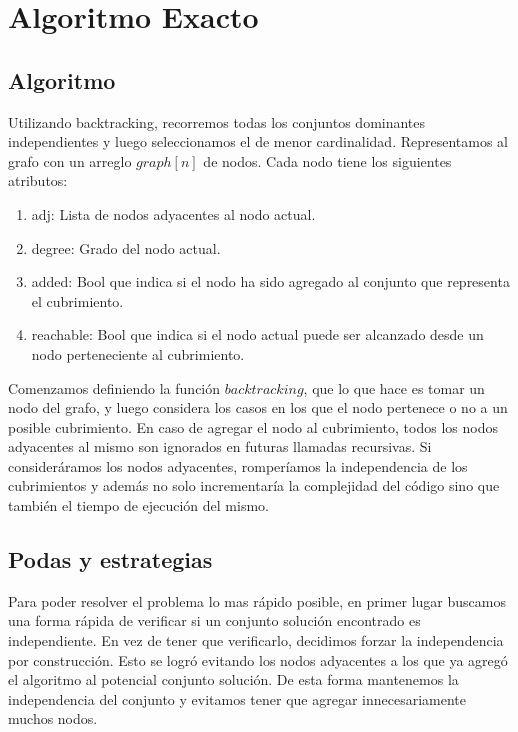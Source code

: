 \section{Algoritmo Exacto}

\subsection{Algoritmo}
Utilizando backtracking, recorremos todas los conjuntos dominantes independientes y luego seleccionamos el de menor cardinalidad.
Representamos al grafo con un arreglo $graph[n]$ de nodos. Cada nodo tiene los siguientes atributos:

\begin{enumerate}
	\item adj: Lista de nodos adyacentes al nodo actual.
	\item degree: Grado del nodo actual.
	\item added: Bool que indica si el nodo ha sido agregado al conjunto que representa el cubrimiento.
	\item reachable: Bool que indica si el nodo actual puede ser alcanzado desde un nodo perteneciente al cubrimiento.
\end{enumerate}

Comenzamos definiendo la función $backtracking$, que lo que hace es tomar un nodo del grafo, y luego considera los casos en los que el nodo pertenece o no a un posible cubrimiento. En caso de agregar el nodo al cubrimiento, todos los nodos adyacentes al mismo son ignorados en futuras llamadas recursivas. Si consideráramos los nodos adyacentes, romperíamos la independencia de los  cubrimientos y además no solo incrementaría la complejidad del código sino que también el tiempo de ejecución del mismo.

\subsection{Podas y estrategias}

Para poder resolver el problema lo mas rápido posible, en primer lugar buscamos una forma rápida de verificar si un conjunto solución encontrado es independiente. En vez de tener que verificarlo, decidimos forzar la independencia por construcción. Esto se logró evitando los nodos adyacentes a los que ya agregó el algoritmo al potencial conjunto solución. De esta forma mantenemos la independencia del conjunto y evitamos tener que agregar innecesariamente muchos nodos. 

